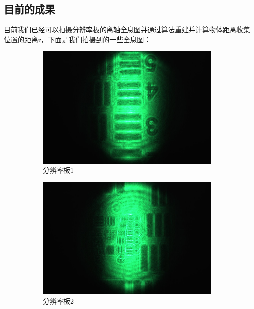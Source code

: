 \documentclass[a4paper]{report} %
\begin{document}
\subsection{目前的成果}
目前我们已经可以拍摄分辨率板的离轴全息图并通过算法重建并计算物体距离收集位置的距离z，下面是我们拍摄到的一些全息图：
\begin{figure}[H]
    \centering
    \begin{subfigure}{0.3\textwidth}
        \includegraphics[width=\linewidth]{lizhou1.jpg}
        \caption{分辨率板1}
    \end{subfigure}
    \begin{subfigure}{0.3\textwidth}
        \includegraphics[width=\linewidth]{lizhou2.jpg}
        \caption{分辨率板2}
    \end{subfigure}
    \begin{subfigure}{0.3\textwidth}

\end{subfigure}
\end{figure}
\end{document}
